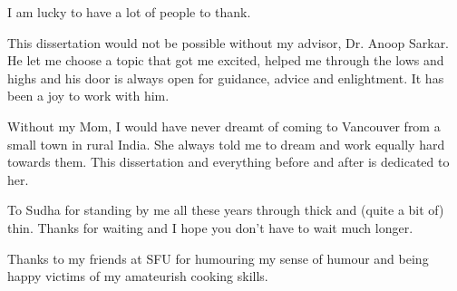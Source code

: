 
%
%


I am lucky to have a lot of people to thank. 

This dissertation would not be possible without my advisor, Dr. Anoop Sarkar. He let me choose a topic that got me excited, helped me through the lows and highs and his door is always open for guidance, advice and enlightment. It has been a joy to work with him. 

Without my Mom, I would have never dreamt of coming to Vancouver from a small town in rural India. She always told me to dream and work equally hard towards them. This dissertation and everything before and after is dedicated to her. 

To Sudha for standing by me all these years through thick and (quite a bit of) thin. Thanks for waiting and I hope you don't have to wait much longer. 

Thanks to my friends at SFU for humouring my sense of humour and being happy victims of my amateurish cooking skills. 











 























